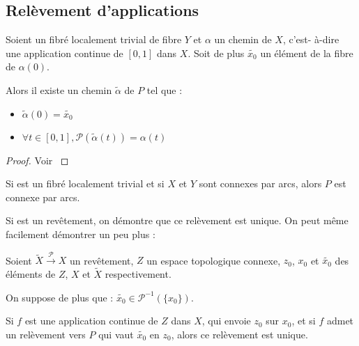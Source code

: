 \subsection{Rel\`evement d'applications}

\begin{comment}
Il est ais\'e de montrer que, lorsque \Fiy est un fibr\'e localement trivial, tel que $X$ et $Y$ sont connexes, alors l'espace total $P$ est connnexe. %
La d\'emonstration de la m\^eme propri\'et\'e concernant la connexit\'e par arcs est la premi\`ere occasion de relever une application continue d'un espace connexe, %
\`a valeurs dans $X$, %
par une fonction \`a valeurs dans $P$.
\end{comment}

\begin{theo}\label{rchefiy}
Soient \Fiy un fibr\'e localement trivial de fibre $Y$ %
et $\alpha$ un chemin de $X$, %
c'est- \`a-dire une application continue de $[0,1]$ dans $X$. %
Soit de plus $\tilde{x_0}$ un \'el\'ement de la fibre de $\alpha (0)$.

Alors il existe un chemin $\tilde{\alpha}$ de $P$ tel que :
\begin{itemize}
\item $\tilde{\alpha}(0)=\tilde{x_0}$
\item $\forall t \in [0,1] , \mathcal{P}(\tilde{\alpha}(t))=\alpha (t)$
\end{itemize}
\end{theo}

\begin{proof}
Voir \cite{NaberF}
\end{proof}

\begin{coro}
Si \Fiy est un fibr\'e localement trivial et si $X$ et $Y$ sont connexes par arcs, alors $P$ est connexe par arcs.
\end{coro}

Si \Fiy est un rev\^etement, on d\'emontre que ce rel\`evement est unique. On peut m\^eme facilement d\'emontrer un peu plus :

\begin{prop}\label{urc}
Soient $\tilde{X} \overset{\mathcal{P}}{\longrightarrow} X$ un rev\^etement, $Z$ un espace topologique connexe, %
$z_0$, $x_0$ et $\tilde{x_0}$ des \'el\'ements de $Z$, $X$ et $\tilde{X}$ respectivement.

\par
On suppose de plus que : $\tilde{x_0}\in\mathcal{P}^{-1}(\{x_0\})$.

\par
Si $f$ est une application continue de $Z$ dans $X$, qui envoie $z_0$ sur $x_0$, et si $f$ admet un rel\`evement vers $P$ qui vaut $\tilde{x_0}$ en $z_0$, %
alors ce rel\`evement est unique.
\end{prop}

